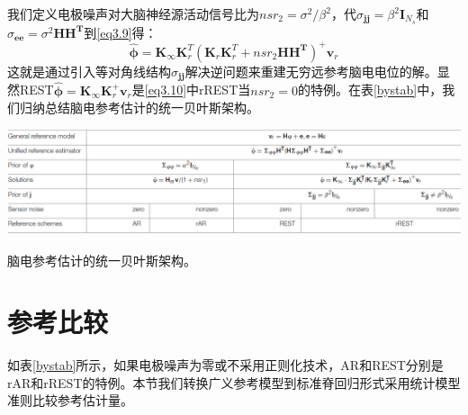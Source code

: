我们定义电极噪声对大脑神经源活动信号比为$nsr_{2}=\sigma^{2}/\beta^{2}$，代$\sigma_{\mathbf{jj}}=\beta^{2}\mathbf{I}_{N_{s}}$和$\sigma_{\mathbf{ee}}=\sigma^{2}\mathbf{HH^{T}}$到\eqref{eq3.9}得：
\begin{equation}\label{eq3.10}
\hat{\mathbf{\phi}}=\mathbf{K}_{\infty}\mathbf{K}_{r}^{T}(\mathbf{K}_{r}\mathbf{K}_{r}^{T}+nsr_{2}\mathbf{HH^{T}})^{+}\mathbf{v}_{r}
\end{equation}
这就是通过引入等对角线结构$\sigma_{\mathbf{jj}}$解决逆问题来重建无穷远参考脑电电位的解。显然REST$\hat{\mathbf{\phi}}=\mathbf{K}_{\infty}\mathbf{K}_{r}^{+}\mathbf{v}_{r}$是\eqref{eq3.10}中rREST当$nsr_{2}=0$的特例。在表\ref{bystab}中，我们归纳总结脑电参考估计的统一贝叶斯架构。
\begin{table}[!h]
\includegraphics[width=\linewidth]{pic/Frontier/bayesiantab.png}
\caption{脑电参考估计的统一贝叶斯架构。}
\label{bystab}
\end{table}

\section{参考比较}
如表\ref{bystab}所示，如果电极噪声为零或不采用正则化技术，AR和REST分别是rAR和rREST的特例。本节我们转换广义参考模型到标准脊回归形式采用统计模型准则比较参考估计量。
